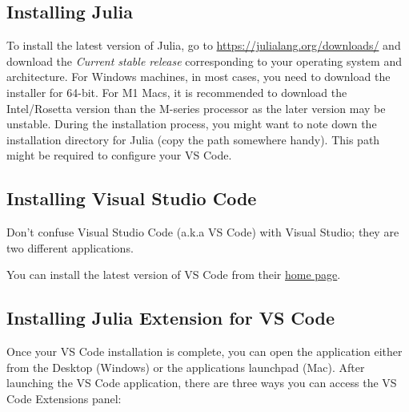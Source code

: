 \documentclass[
  letterpaper,
]{book}
\begin{document}
\hypertarget{sec-install-julia}{%
\subsection{Installing Julia}\label{sec-install-julia}}

To install the latest version of Julia, go to
\url{https://julialang.org/downloads/} and download the \emph{Current
stable release} corresponding to your operating system and architecture.
For Windows machines, in most cases, you need to download the installer
for 64-bit. For M1 Macs, it is recommended to download the Intel/Rosetta
version than the M-series processor as the later version may be
unstable. During the installation process, you might want to note down
the installation directory for Julia (copy the path somewhere handy).
This path might be required to configure your VS Code.

\hypertarget{installing-visual-studio-code}{%
\subsection{Installing Visual Studio
Code}\label{installing-visual-studio-code}}

\begin{tcolorbox}[standard jigsaw,bottomtitle=1mm, titlerule=0mm, title=\textcolor{quarto-callout-note-color}{\faInfo}\hspace{0.5em}{Note}, leftrule=.75mm, toptitle=1mm, arc=.35mm, rightrule=.15mm, opacitybacktitle=0.6, colframe=quarto-callout-note-color-frame, bottomrule=.15mm, colbacktitle=quarto-callout-note-color!10!white, colback=white, toprule=.15mm, left=2mm, coltitle=black, opacityback=0]
Don't confuse Visual Studio Code (a.k.a VS Code) with Visual Studio;
they are two different applications.
\end{tcolorbox}

You can install the latest version of VS Code from their
\href{https://code.visualstudio.com}{home page}.

\hypertarget{installing-julia-extension-for-vs-code}{%
\subsection{Installing Julia Extension for VS
Code}\label{installing-julia-extension-for-vs-code}}

Once your VS Code installation is complete, you can open the application
either from the Desktop (Windows) or the applications launchpad (Mac).
After launching the VS Code application, there are three ways you can
access the VS Code Extensions panel:
\end{document}
